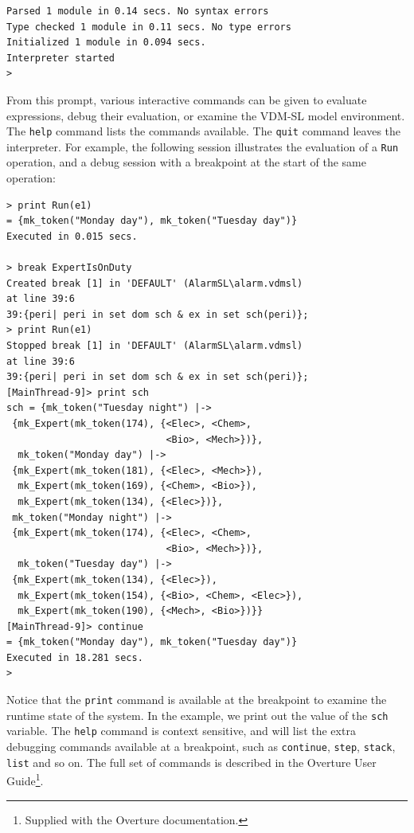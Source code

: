 \begin{lstlisting}[style=tool]
Parsed 1 module in 0.14 secs. No syntax errors
Type checked 1 module in 0.11 secs. No type errors
Initialized 1 module in 0.094 secs. 
Interpreter started
>
\end{lstlisting}

\noindent From this prompt, various interactive commands can be given to evaluate expressions, debug their evaluation, or examine the VDM-SL model environment.  The \verb|help| command lists the commands
available. The \verb|quit| command leaves the interpreter. For example, the following session illustrates the evaluation of a \verb|Run| operation, and a debug session with a breakpoint at the start of the same operation:

\begin{minipage}{ \linewidth}
\begin{lstlisting}[style=tool]
> print Run(e1)
= {mk_token("Monday day"), mk_token("Tuesday day")}
Executed in 0.015 secs.

> break ExpertIsOnDuty
Created break [1] in 'DEFAULT' (AlarmSL\alarm.vdmsl) 
at line 39:6
39:{peri| peri in set dom sch & ex in set sch(peri)};
> print Run(e1)
Stopped break [1] in 'DEFAULT' (AlarmSL\alarm.vdmsl) 
at line 39:6
39:{peri| peri in set dom sch & ex in set sch(peri)};
[MainThread-9]> print sch
sch = {mk_token("Tuesday night") |->
 {mk_Expert(mk_token(174), {<Elec>, <Chem>, 
                            <Bio>, <Mech>})},
  mk_token("Monday day") |->
 {mk_Expert(mk_token(181), {<Elec>, <Mech>}),
  mk_Expert(mk_token(169), {<Chem>, <Bio>}),
  mk_Expert(mk_token(134), {<Elec>})},
 mk_token("Monday night") |->
 {mk_Expert(mk_token(174), {<Elec>, <Chem>, 
                            <Bio>, <Mech>})},
  mk_token("Tuesday day") |->
 {mk_Expert(mk_token(134), {<Elec>}),
  mk_Expert(mk_token(154), {<Bio>, <Chem>, <Elec>}),
  mk_Expert(mk_token(190), {<Mech>, <Bio>})}}
[MainThread-9]> continue
= {mk_token("Monday day"), mk_token("Tuesday day")}
Executed in 18.281 secs. 
> 
\end{lstlisting}
\end{minipage}

\noindent Notice that the \verb|print| command is available at the breakpoint to examine the runtime state of the system. In the example, we print out the value of the \verb|sch| variable. The \verb|help|
command is context sensitive, and will list the extra debugging commands available at a breakpoint, such as \verb|continue|, \verb|step|, \verb|stack|, \verb|list| and so on. The full set of commands is described in the Overture User Guide\footnote{Supplied with the Overture documentation.}.

